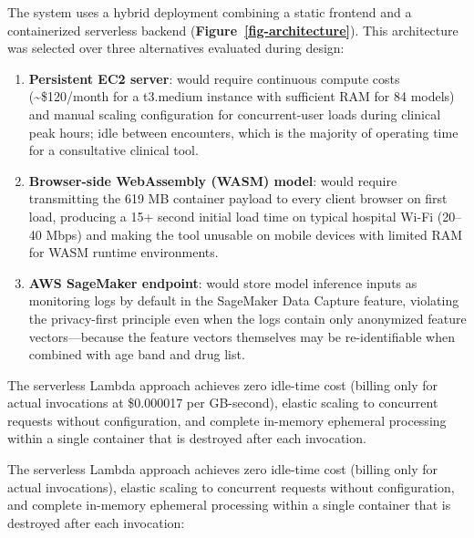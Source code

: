 \documentclass[
  12pt,
]{book}
\begin{document}
The system uses a hybrid deployment combining a static frontend and a
containerized serverless backend
(\textbf{Figure~\ref{fig-architecture}}). This architecture was selected
over three alternatives evaluated during design:

\begin{enumerate}
\def\labelenumi{(\arabic{enumi})}
\item
  \textbf{Persistent EC2 server}: would require continuous compute costs
  (\textasciitilde\$120/month for a t3.medium instance with sufficient
  RAM for 84 models) and manual scaling configuration for
  concurrent-user loads during clinical peak hours; idle between
  encounters, which is the majority of operating time for a consultative
  clinical tool.
\item
  \textbf{Browser-side WebAssembly (WASM) model}: would require
  transmitting the 619 MB container payload to every client browser on
  first load, producing a 15+ second initial load time on typical
  hospital Wi-Fi (20--40 Mbps) and making the tool unusable on mobile
  devices with limited RAM for WASM runtime environments.
\item
  \textbf{AWS SageMaker endpoint}: would store model inference inputs as
  monitoring logs by default in the SageMaker Data Capture feature,
  violating the privacy-first principle even when the logs contain only
  anonymized feature vectors---because the feature vectors themselves
  may be re-identifiable when combined with age band and drug list.
\end{enumerate}

The serverless Lambda approach achieves zero idle-time cost (billing
only for actual invocations at \$0.000017 per GB-second), elastic
scaling to concurrent requests without configuration, and complete
in-memory ephemeral processing within a single container that is
destroyed after each invocation.

The serverless Lambda approach achieves zero idle-time cost (billing
only for actual invocations), elastic scaling to concurrent requests
without configuration, and complete in-memory ephemeral processing
within a single container that is destroyed after each invocation:
\end{document}

